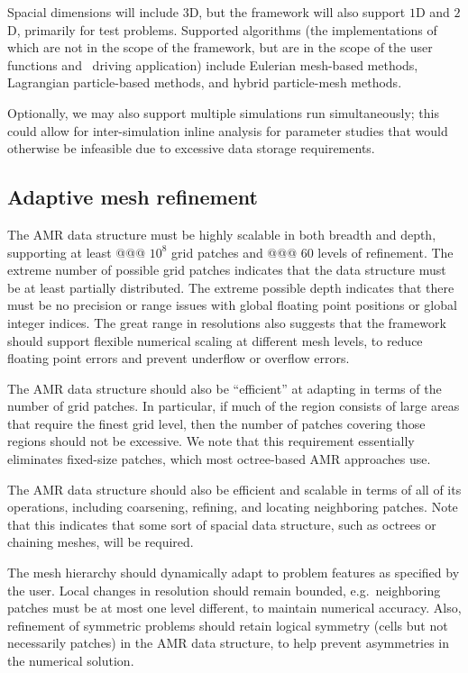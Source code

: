 \documentclass{article}
\begin{document}
Spacial dimensions will include $3$D, but the framework will also
support $1$D and $2$D, primarily for test problems.  Supported
algorithms (the implementations of which are not in the scope of the
framework, but are in the scope of the user functions and \enzoii\
driving application) include Eulerian mesh-based methods, Lagrangian
particle-based methods, and hybrid particle-mesh methods.  

Optionally, we may also support multiple simulations run
simultaneously; this could allow for inter-simulation inline analysis
for parameter studies that would otherwise be infeasible due to
excessive data storage requirements.


\subsection{Adaptive mesh refinement} \label{ss:require-data}

The AMR data structure must be highly scalable in both breadth and
depth, supporting at least @@@ $10^8$ grid patches and @@@ $60$ levels
of refinement.  The extreme number of possible grid patches indicates
that the data structure must be at least partially distributed.  The
extreme possible depth indicates that there must be no precision or
range issues with global floating point positions or global integer
indices.  The great range in resolutions also suggests that the
framework should support flexible numerical scaling at different mesh
levels, to reduce floating point errors and prevent underflow or
overflow errors.

The AMR data structure should also be ``efficient'' at adapting in
terms of the number of grid patches.  In particular, if much of the
region consists of large areas that require the finest grid level,
then the number of patches covering those regions should not be
excessive.  We note that this requirement essentially eliminates
fixed-size patches, which most octree-based AMR approaches use.

The AMR data structure should also be efficient and scalable in terms
of all of its operations, including coarsening, refining, and locating
neighboring patches.  Note that this indicates that some sort of
spacial data structure, such as octrees or chaining meshes, will
be required.

The mesh hierarchy should dynamically adapt to problem features as
specified by the user.  Local changes in resolution should remain
bounded, e.g.~neighboring patches must be at most one level different,
to maintain numerical accuracy.  Also, refinement of symmetric
problems should retain logical symmetry (cells but not necessarily
patches) in the AMR data structure, to help prevent asymmetries in the
numerical solution.
\end{document}
